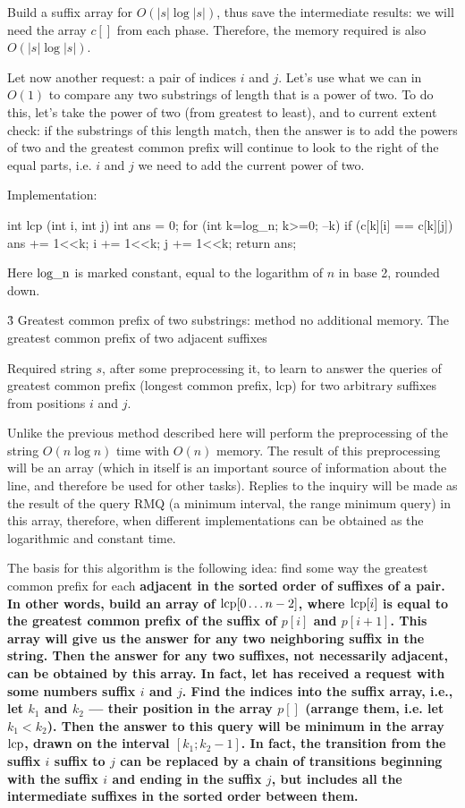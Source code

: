 Build a suffix array for $O (|s| \log |s|)$, thus save the intermediate results: we will need the array $c[]$ from each phase. Therefore, the memory required is also $O (|s| \log |s|)$.

Let now another request: a pair of indices $i$ and $j$. Let's use what we can in $O(1)$ to compare any two substrings of length that is a power of two. To do this, let's take the power of two (from greatest to least), and to current extent check: if the substrings of this length match, then the answer is to add the powers of two and the greatest common prefix will continue to look to the right of the equal parts, i.e. $i$ and $j$ we need to add the current power of two.

Implementation:

\code
int lcp (int i, int j) {
int ans = 0;
for (int k=log_n; k>=0; --k)
if (c[k][i] == c[k][j]) {
ans += 1<<k;
i += 1<<k;
j += 1<<k;
}
return ans;
}
\endcode

Here $\rm log\_n$ is marked constant, equal to the logarithm of $n$ in base 2, rounded down.


\h3{ Greatest common prefix of two substrings: method no additional memory. The greatest common prefix of two adjacent suffixes }

Required string $s$, after some preprocessing it, to learn to answer the queries of greatest common prefix (longest common prefix, lcp) for two arbitrary suffixes from positions $i$ and $j$.

Unlike the previous method described here will perform the preprocessing of the string $O(n \log n)$ time with $O(n)$ memory. The result of this preprocessing will be an array (which in itself is an important source of information about the line, and therefore be used for other tasks). Replies to the inquiry will be made as the result of the query RMQ (a minimum interval, the range minimum query) in this array, therefore, when different implementations can be obtained as the logarithmic and constant time.

The basis for this algorithm is the following idea: find some way the greatest common prefix for each \bf{adjacent in the sorted order of suffixes of a pair}. In other words, build an array of ${\rm lcp}[0 \ldots n-2]$, where ${\rm lcp}[i]$ is equal to the greatest common prefix of the suffix of $p[i]$ and $p[i+1]$. This array will give us the answer for any two neighboring suffix in the string. Then the answer for any two suffixes, not necessarily adjacent, can be obtained by this array. In fact, let has received a request with some numbers suffix $i$ and $j$. Find the indices into the suffix array, i.e., let $k_1$ and $k_2$ --- their position in the array $p[]$ (arrange them, i.e. let $k_1 < k_2$). Then the answer to this query will be minimum in the array $\rm lcp$, drawn on the interval $[k_1; k_2-1]$. In fact, the transition from the suffix $i$ suffix to $j$ can be replaced by a chain of transitions beginning with the suffix $i$ and ending in the suffix $j$, but includes all the intermediate suffixes in the sorted order between them.

